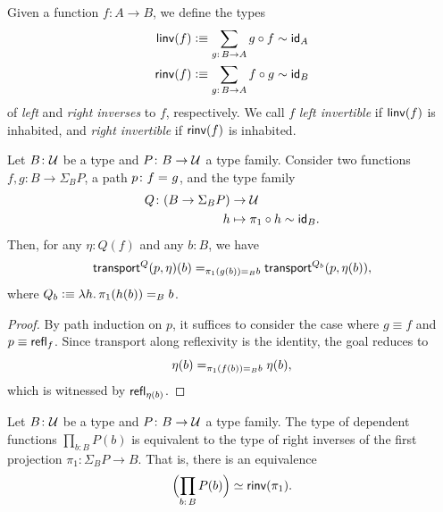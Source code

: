 \begin{defn}\label{defn:left-right-inverses}
    Given a function $f\colon A\to B$, we define the types
    \begin{align*}
        \fun{linv}(f)
            &\defeq\sum_{g\colon B\to A}g\circ f\sim \id_A\\
        \fun{rinv}(f)
            &\defeq\sum_{g\colon B\to A}f\circ g\sim\id_B
    \end{align*}
    of \textsl{left} and \textsl{right inverses} to $f$, respectively. We call $f$ \textsl{left invertible} if $\mathsf{linv}(f)$ is inhabited, and \textsl{right invertible} if $\mathsf{rinv}(f)$ is inhabited.
\end{defn}

\begin{lem}\label{lem:transport-Q}
    Let\/ $B\colon\univ$ be a type and\/ $P\colon B\to\univ$ a type family. Consider two functions\/ $f,g\colon B\to\Sigma_BP$, a path\/ $p\colon f\eq{}g$, and the type family
    \begin{align*}
        Q\colon(B\to\Sigma_BP)&\to\univ\\
        h&\mapsto\pi_1\circ h\sim\id_B.
    \end{align*}
    Then, for any\/ $\eta\colon Q(f)$ and any\/ $b\colon B$, we have
    \[
        \mathsf{transport}^Q(p,\eta)(b)
        \mathrel{=_{\pi_1(g(b))\mathrel{=_{B}}b}}\mathsf{transport}^{Q_b}(p,\eta(b)),
    \]
    where\/ $Q_b\mathrel{\vcentcolon}\equiv\lambda h.\,\pi_1(h(b))\mathrel{=_{B}}b$.
\end{lem}

\begin{proof}
    By path induction on $p$, it suffices to consider the case where $g\equiv f$ and $p\equiv\mathsf{refl}_f$. Since transport along reflexivity is the identity, the goal reduces to
    \[
        \eta(b)\mathrel{=_{\pi_1(f(b))\mathrel{=_{B}}b}}\eta(b),
    \]
    which is witnessed by $\mathsf{refl}_{\eta(b)}$.
\end{proof}

\begin{thm}\fe\label{thm:pi-sections}
    Let $B\colon\univ$ be a type and $P\colon B\to\univ$ a type family. The type of dependent functions $\prod_{b\colon B}P(b)$ is equivalent to the type of right inverses of the first projection $\pi_1\colon\Sigma_BP\to B$. That is, there is an equivalence
    \[
        \Bigl(
            \prod_{b\colon B}P(b)
        \Bigr)
        \simeq
        \fun{rinv}(\pi_1).
    \]
\end{thm}

